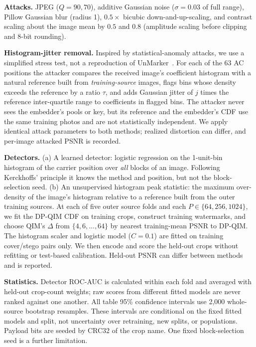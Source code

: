 \documentclass[conference,10pt]{IEEEtran}
\begin{document}
\textbf{Attacks.} JPEG ($Q{=}90,70$), additive Gaussian noise ($\sigma{=}0.03$
of full range), Pillow Gaussian blur (radius 1), $0.5\times$ bicubic
down-and-up-scaling, and contrast scaling about the image mean by $0.5$ and
$0.8$ (amplitude scaling before clipping and 8-bit rounding).

\textbf{Histogram-jitter removal.} Inspired by statistical-anomaly attacks,
we use a simplified stress test, not a reproduction of
UnMarker~\cite{Kassis2025unmarker}. For each of the 63 AC positions the
attacker compares the received image's coefficient histogram with a natural
reference built from \emph{training-source} images, flags bins whose density
exceeds the reference by a ratio $\tau$, and adds Gaussian jitter of $j$ times
the reference inter-quartile range to coefficients in flagged bins. The
attacker never sees the embedder's pools or key, but its reference and the
embedder's CDF use the same training photos and are not statistically
independent. We apply identical attack parameters to both methods; realized
distortion can differ, and per-image attacked PSNR is recorded.

\textbf{Detectors.} (a) A learned detector: logistic regression on the
1-unit-bin histogram of the carrier position over \emph{all} blocks of an
image. Following Kerckhoffs' principle it knows the method and position, but
not the block-selection seed. (b) An unsupervised histogram peak
statistic: the maximum over-density of the image's histogram relative to a
reference built from the outer training sources. At each of five outer
source folds and each $P\in\{64,256,1024\}$, we fit the DP-QIM CDF on training
crops, construct training watermarks, and choose QIM's $\Delta$ from
$\{4,6,\ldots,64\}$ by nearest training-mean PSNR to DP-QIM. The histogram
scaler and logistic model ($C=0.1$) are fitted on training cover/stego pairs
only. We then encode and score the held-out crops without refitting or
test-based calibration. Held-out PSNR can differ between methods and is reported.

\textbf{Statistics.} Detector ROC-AUC is calculated within each fold and
averaged with held-out crop-count weights; raw scores from different fitted
models are never ranked against one another. All table 95\% confidence
intervals use 2{,}000 whole-source bootstrap resamples. These intervals are
conditional on the fixed fitted models and split, not uncertainty over
retraining, new splits, or populations. Payload bits are seeded by CRC32
of the crop name. One fixed block-selection seed is a further limitation.
\end{document}
